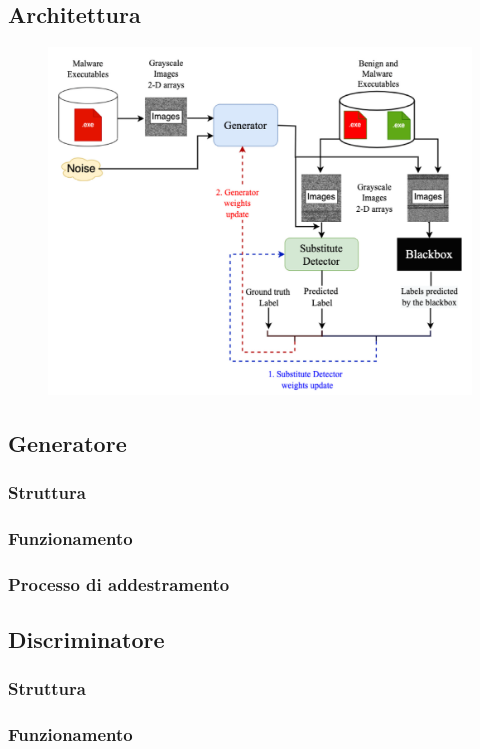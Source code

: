 \subsection{Architettura}
\begin{figure}[ht]
    \centering
        \centering
        \includegraphics[width=0.8\linewidth]{images/GAN_architecture.png}
        \label{fig:gan_architecture}
\end{figure}

\subsection{Generatore}
\subsubsection{Struttura}
\subsubsection{Funzionamento}
\subsubsection{Processo di addestramento}

\subsection{Discriminatore}
\subsubsection{Struttura}
\subsubsection{Funzionamento}
